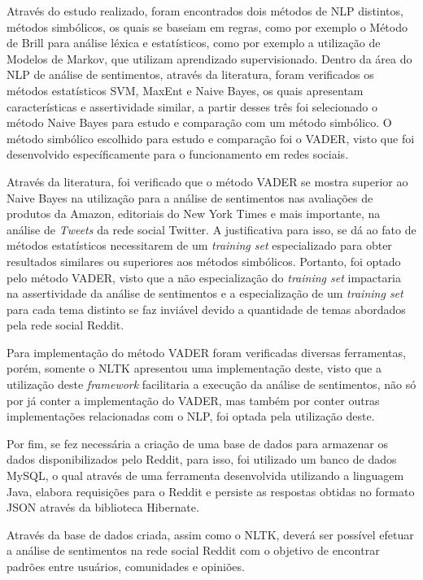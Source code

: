 Através do estudo realizado, foram encontrados dois métodos de \ac{NLP}
distintos, métodos simbólicos, os quais se baseiam em regras, como por exemplo o
Método de Brill para análise léxica e estatísticos, como por exemplo a
utilização de Modelos de Markov, que utilizam aprendizado supervisionado. Dentro
da área do \ac{NLP} de análise de sentimentos, através da literatura, foram
verificados os métodos estatísticos \ac{SVM}, \ac{MaxEnt} e Naive Bayes, os quais apresentam
características e assertividade similar, a partir desses três foi
selecionado o método Naive Bayes para estudo e comparação com um método
simbólico. O método simbólico escolhido para estudo e comparação foi o
\ac{VADER}, visto que foi desenvolvido específicamente para o funcionamento em
redes sociais.
 
Através da literatura, foi verificado que o método \ac{VADER} se mostra superior
ao Naive Bayes na utilização para a análise de sentimentos nas avaliações de
produtos da Amazon, editoriais do New York Times e mais importante, na análise
de \textit{Tweets} da rede social Twitter. A justificativa para isso, se dá ao
fato de métodos estatísticos necessitarem de um \textit{training set}
especializado para obter resultados similares ou superiores aos métodos
simbólicos. Portanto, foi optado pelo método \ac{VADER}, visto que a não
especialização do \textit{training set} impactaria na assertividade da análise
de sentimentos e a especialização de um \textit{training set} para cada tema
distinto se faz inviável devido a quantidade de temas abordados pela rede social
Reddit. 

Para implementação do método \ac{VADER} foram verificadas diversas
ferramentas, porém, somente o \ac{NLTK} apresentou uma implementação deste,
visto que a utilização deste \textit{framework} facilitaria a execução da
análise de sentimentos, não só por já conter a implementação do \ac{VADER}, mas
também por conter outras implementações relacionadas com o \ac{NLP}, foi optada
pela utilização deste.
 
Por fim, se fez necessária a criação de uma base de dados para armazenar os
dados disponibilizados pelo Reddit, para isso, foi utilizado um banco de
dados MySQL, o qual através de uma ferramenta desenvolvida utilizando a
linguagem Java, elabora requisições para o Reddit e
persiste as respostas obtidas no formato JSON através da biblioteca
Hibernate. 

Através da base de dados criada, assim como o \ac{NLTK}, deverá ser possível
efetuar a análise de sentimentos na rede social Reddit com o objetivo de
encontrar padrões entre usuários, comunidades e opiniões.

